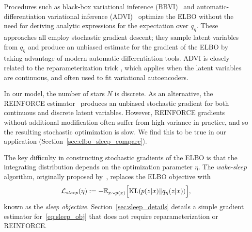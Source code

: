 
Procedures such as black-box variational inference (BBVI)~\citep{ranganath2013black} and 
automatic-differentiation variational inference (ADVI)~\citep{kucukelbir2016automatic}
optimize the ELBO  without the need for 
deriving analytic expressions for the expectation over $q_\eta$.  
These approaches all employ stochastic gradient descent; 
they sample latent variables from $q_\eta$ and produce an unbiased estimate for the gradient of the ELBO by taking advantage of modern automatic differentiation tools. 
ADVI is closely related to the reparameterization trick \citep{kingma2013autoencoding, rezende2014stochastic}, which applies when the latent variables are continuous, and often used to fit variational autoencoders. 

In our model, the number of stars $N$ is discrete.
As an alternative, the REINFORCE estimator~\citep{Williams1992reinforce} produces an unbiased stochastic gradient for both continuous and discrete latent variables.
However, REINFORCE gradients without additional modification often suffer from high variance in practice, and so the resulting stochastic optimization is slow. We find this to be true in our application (Section~\ref{sec:elbo_sleep_compare}). 

The key difficulty in constructing stochastic gradients of the ELBO is that the integrating distribution depends on the optimization parameter $\eta$. 
The {\itshape wake-sleep} algorithm, originally proposed by~\cite{Hinton1995wake_sleep}, replaces the 
ELBO objective with 
\begin{align}
    \mathcal{L}_{sleep}(\eta) := 
    - \mathbb{E}_{x \sim p(x)}\Big[\textrm{KL}(p(z | x) \| q_\eta(z | x))\Big]
    \label{eq:sleep_obj},
\end{align}
known as the {\itshape sleep objective}.  Section~\ref{sec:sleep_details} details a simple gradient estimator for~\eqref{eq:sleep_obj} that does not require reparameterization or REINFORCE. 

